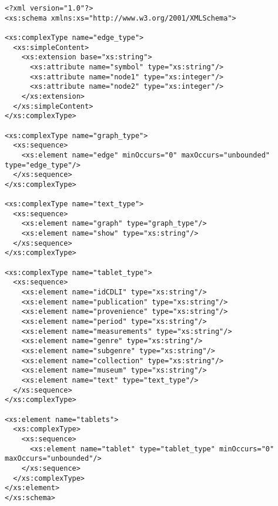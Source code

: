 \begin{verbatim}
<?xml version="1.0"?>
<xs:schema xmlns:xs="http://www.w3.org/2001/XMLSchema">

<xs:complexType name="edge_type">
  <xs:simpleContent>
    <xs:extension base="xs:string">
      <xs:attribute name="symbol" type="xs:string"/>
      <xs:attribute name="node1" type="xs:integer"/>
      <xs:attribute name="node2" type="xs:integer"/>
    </xs:extension>
  </xs:simpleContent>
</xs:complexType>

<xs:complexType name="graph_type">
  <xs:sequence>
    <xs:element name="edge" minOccurs="0" maxOccurs="unbounded" type="edge_type"/>
  </xs:sequence>
</xs:complexType>

<xs:complexType name="text_type">
  <xs:sequence>
    <xs:element name="graph" type="graph_type"/>
    <xs:element name="show" type="xs:string"/>
  </xs:sequence>
</xs:complexType>

<xs:complexType name="tablet_type">
  <xs:sequence>
    <xs:element name="idCDLI" type="xs:string"/>
    <xs:element name="publication" type="xs:string"/>
    <xs:element name="provenience" type="xs:string"/>
    <xs:element name="period" type="xs:string"/>
    <xs:element name="measurements" type="xs:string"/>
    <xs:element name="genre" type="xs:string"/>
    <xs:element name="subgenre" type="xs:string"/>
    <xs:element name="collection" type="xs:string"/>
    <xs:element name="museum" type="xs:string"/>	
    <xs:element name="text" type="text_type"/>		
  </xs:sequence>
</xs:complexType>

<xs:element name="tablets">
  <xs:complexType>
    <xs:sequence>
      <xs:element name="tablet" type="tablet_type" minOccurs="0" maxOccurs="unbounded"/>
    </xs:sequence>
  </xs:complexType>
</xs:element>
</xs:schema>
\end{verbatim}
